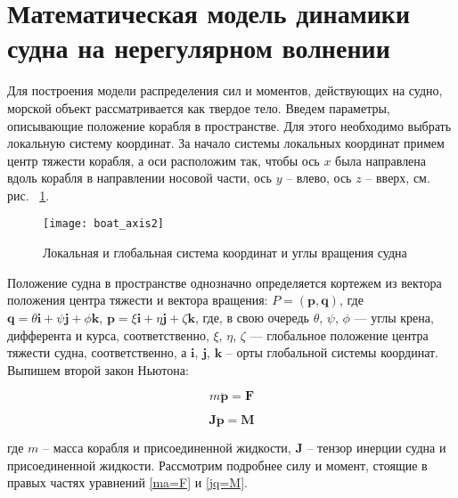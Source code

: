 \section{Математическая модель динамики судна на нерегулярном волнении}
\label{math_ship}

Для построения модели распределения сил и моментов, действующих на судно, морской объект рассматривается как твердое тело. Введем параметры, описывающие положение корабля в пространстве. Для этого необходимо выбрать локальную систему координат. За начало системы локальных координат примем центр тяжести корабля, а оси расположим так, чтобы ось $x$ была направлена вдоль корабля в направлении носовой части, ось $y$ – влево, ось $z$ – вверх, см. рис. ~\ref{boat_axis}.

\begin{figure}[ht]
\begin{center}
\texttt{[image: boat\_axis2]}
\end{center}
\caption{Локальная и глобальная система координат и углы вращения судна}
\label{boat_axis}
\end{figure}

Положение судна в пространстве однозначно определяется кортежем из вектора положения центра тяжести и вектора вращения: 
$P=(\mathbf{p},\mathbf{q})$, 
где  
$\mathbf{q}=\theta \mathbf{i}+\psi \mathbf{j}+\phi \mathbf{k}$, 
$\mathbf{p}=\xi \mathbf{i}+\eta \mathbf{j}+\zeta \mathbf{k}$, 
где, в свою очередь $\theta$, $\psi$, $\phi$ --- углы крена, дифферента и курса, соответственно, 
 $\xi$, $\eta$, $\zeta$ --- глобальное положение центра тяжести судна, соответственно, 
а $\mathbf{i}$, $\mathbf{j}$, $\mathbf{k}$ – орты глобальной системы координат. Выпишем второй закон Ньютона:

\begin{equation}
	m \ddot{\mathbf{p}} = \mathbf{F}
	\label{ma=F}
\end{equation}

\begin{equation}
	\mathbf{J}  \ddot{\mathbf{p}} = \mathbf{M}
	\label{jq=M}
\end{equation}

где $m$ – масса корабля и присоединенной жидкости, $\mathbf{J}$ – тензор инерции судна и присоединенной жидкости. Рассмотрим подробнее силу и момент, стоящие в правых частях уравнений \eqref{ma=F} и \eqref{jq=M}. 

